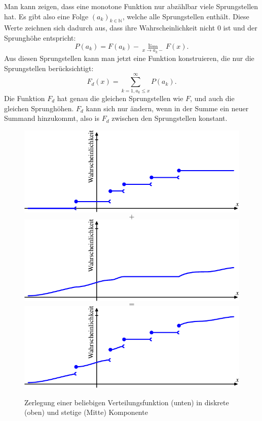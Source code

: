 Man kann zeigen, dass eine monotone Funktion nur abzählbar viele Sprungstellen
hat.
Es gibt also eine Folge $(a_k)_{k\in\mathbb{N}}$, welche alle
Sprungstellen enthält.
Diese Werte zeichnen sich dadurch aus, dass ihre
Wahrscheinlichkeit nicht $0$ ist und der Sprunghöhe entspricht:
\[
P(a_k)=F(a_k)-\lim_{x\to a_k-}F(x).
\]
Aus diesen Sprungstellen kann man jetzt eine Funktion konstruieren,
die nur die Sprungstellen berücksichtigt:
\[
F_d(x)=\sum_{k=1, a_k\le x}^\infty P(a_k).
\]
Die Funktion $F_d$ hat genau die gleichen Sprungstellen wie $F$, und
auch die gleichen Sprunghöhen.
$F_d$ kann sich nur ändern, wenn in der
Summe ein neuer Summand hinzukommt, also is $F_d$ zwischen den Sprungstellen
konstant.

\begin{figure}
\begin{center}
\includegraphics{images/verteilungsfunktion-3}
\[
+
\]
\includegraphics{images/verteilungsfunktion-4}
\[
=
\]
\includegraphics{images/verteilungsfunktion-2}
\end{center}
\caption{Zerlegung einer beliebigen Verteilungsfunktion (unten) in diskrete (oben)
und stetige (Mitte) Komponente\label{bildzerlegungverteilungsfunktion}}
\end{figure}

